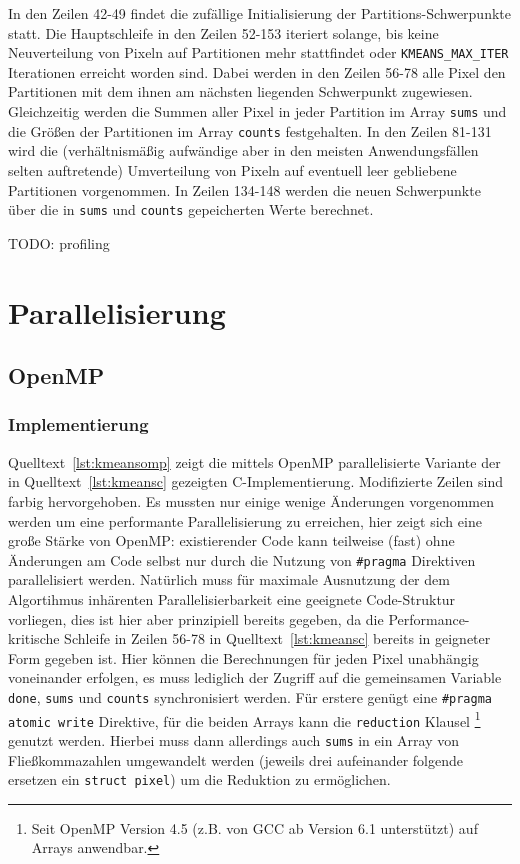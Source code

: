 \documentclass[
    bibliography=totoc, cd=lightcolor, cdmath=false, ngerman]{tudscrreprt}
\begin{document}
In den Zeilen 42-49 findet die zufällige Initialisierung der
Partitions-Schwerpunkte statt. Die Hauptschleife in den Zeilen 52-153 iteriert
solange, bis keine Neuverteilung von Pixeln auf Partitionen mehr stattfindet
oder \texttt{KMEANS\_MAX\_ITER} Iterationen erreicht worden sind. Dabei werden
in den Zeilen 56-78 alle Pixel den Partitionen mit dem ihnen am nächsten
liegenden Schwerpunkt zugewiesen. Gleichzeitig werden die Summen aller Pixel in
jeder Partition im Array \texttt{sums} und die Größen der Partitionen im Array
\texttt{counts} festgehalten. In den Zeilen 81-131 wird die (verhältnismäßig
aufwändige aber in den meisten Anwendungsfällen selten auftretende)
Umverteilung von Pixeln auf eventuell leer gebliebene Partitionen vorgenommen.
In Zeilen 134-148 werden die neuen Schwerpunkte über die in \texttt{sums} und
\texttt{counts} gepeicherten Werte berechnet.

TODO: profiling



\chapter{Parallelisierung}

\section{OpenMP}

\subsection{Implementierung}

Quelltext~\ref{lst:kmeansomp} zeigt die mittels OpenMP parallelisierte Variante
der in Quelltext~\ref{lst:kmeansc} gezeigten C-Implementierung. Modifizierte
Zeilen sind farbig hervorgehoben. Es mussten nur einige wenige Änderungen
vorgenommen werden um eine performante Parallelisierung zu erreichen, hier
zeigt sich eine große Stärke von OpenMP: existierender Code kann teilweise
(fast) ohne Änderungen am Code selbst nur durch die Nutzung von
\texttt{\#pragma} Direktiven parallelisiert werden.  Natürlich muss für
maximale Ausnutzung der dem Algortihmus inhärenten Parallelisierbarkeit eine
geeignete Code-Struktur vorliegen, dies ist hier aber prinzipiell bereits
gegeben, da die Performance-kritische Schleife in Zeilen 56-78 in
Quelltext~\ref{lst:kmeansc} bereits in geigneter Form gegeben ist.
Hier können die Berechnungen für jeden Pixel unabhängig voneinander erfolgen,
es muss lediglich der Zugriff auf die gemeinsamen Variable \texttt{done},
\texttt{sums} und \texttt{counts} synchronisiert werden. Für erstere genügt
eine \texttt{\#pragma atomic write} Direktive, für die beiden Arrays kann die
\texttt{reduction} Klausel \footnote{Seit OpenMP Version 4.5 (z.B. von GCC ab
Version 6.1 unterstützt) auf Arrays anwendbar.} genutzt werden. Hierbei muss
dann allerdings auch \texttt{sums} in ein Array von Fließkommazahlen
umgewandelt werden (jeweils drei aufeinander folgende ersetzen ein
\texttt{struct pixel}) um die Reduktion zu ermöglichen.
\end{document}
